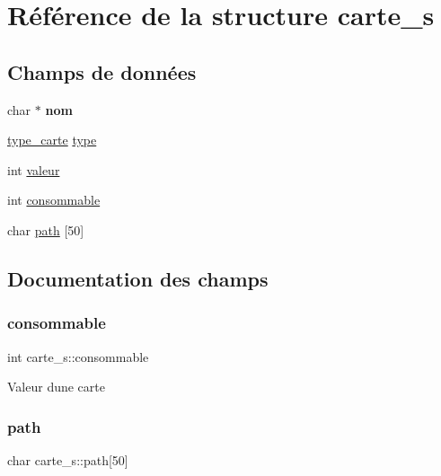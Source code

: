 \hypertarget{structcarte__s}{}\section{Référence de la structure carte\+\_\+s}
\label{structcarte__s}
\subsection*{Champs de données}
\begin{DoxyCompactItemize}
\item 
\mbox{\label{structcarte__s_ab9392e0daefb7741dfd865fe8325c9ec}} 
char $\ast$ {\bfseries nom}
\item 
\hyperlink{constantes_8h_a8fb27eb0b354a4f35787ef57ac90e0eb}{type\+\_\+carte} \hyperlink{structcarte__s_aaf26c6876557066201a63c65c9ef8e5a}{type}
\item 
int \hyperlink{structcarte__s_a432f48dcc3d414a0bdaeb77855060ee1}{valeur}
\item 
int \hyperlink{structcarte__s_ae3d8785ea9e22eb0115da8559cea7a72}{consommable}
\item 
char \hyperlink{structcarte__s_a14809611dd8bd07afb3c525eeb95d1e4}{path} \mbox{[}50\mbox{]}
\end{DoxyCompactItemize}


\subsection{Documentation des champs}
\mbox{\label{structcarte__s_ae3d8785ea9e22eb0115da8559cea7a72}} 
\subsubsection{\texorpdfstring{consommable}{consommable}}
{\footnotesize\ttfamily int carte\+\_\+s\+::consommable}

Valeur d\textquotesingle{}une carte \mbox{\label{structcarte__s_a14809611dd8bd07afb3c525eeb95d1e4}} 
\subsubsection{\texorpdfstring{path}{path}}
{\footnotesize\ttfamily char carte\+\_\+s\+::path\mbox{[}50\mbox{]}}

